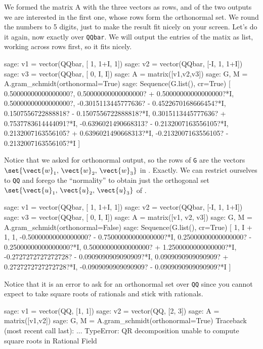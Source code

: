 %
We formed the matrix A with the three vectors as rows, and of the two outputs we are interested in the first one, whose rows form the orthonormal set.  We round the numbers to 5 digits, just to make the result fit nicely on your screen.  Let's do it again, now exactly over \verb?QQbar?.  We will output the entries of the matix as list, working across rows first, so it fits nicely.
%
\begin{sageexample}
sage: v1 = vector(QQbar, [ 1, 1+I,   1])
sage: v2 = vector(QQbar, [-I,   1, 1+I])
sage: v3 = vector(QQbar, [ 0,   I,   I])
sage: A = matrix([v1,v2,v3])
sage: G, M = A.gram_schmidt(orthonormal=True)
sage: Sequence(G.list(), cr=True)
[
0.50000000000000000?,
0.50000000000000000? + 0.50000000000000000?*I,
0.50000000000000000?,
-0.3015113445777636? - 0.4522670168666454?*I,
0.1507556722888818? - 0.1507556722888818?*I,
0.3015113445777636? + 0.7537783614444091?*I,
-0.6396021490668313? - 0.2132007163556105?*I,
0.2132007163556105? + 0.6396021490668313?*I,
-0.2132007163556105? - 0.2132007163556105?*I
]
\end{sageexample}
%
Notice that we asked for orthonormal output, so the rows of \verb?G? are the vectors $\set{\vect{w}_1,\,\vect{w}_2,\,\vect{w}_3}$ in .  Exactly.  We can restrict ourselves to \verb?QQ? and forego the ``normality'' to obtain just the orthogonal set $\set{\vect{u}_1,\,\vect{u}_2,\,\vect{u}_3}$ of .
%
\begin{sageexample}
sage: v1 = vector(QQbar, [ 1, 1+I,   1])
sage: v2 = vector(QQbar, [-I,   1, 1+I])
sage: v3 = vector(QQbar, [ 0,   I,   I])
sage: A = matrix([v1, v2, v3])
sage: G, M = A.gram_schmidt(orthonormal=False)
sage: Sequence(G.list(), cr=True)
[
1,
I + 1,
1,
-0.50000000000000000? - 0.75000000000000000?*I,
0.25000000000000000? - 0.25000000000000000?*I,
0.50000000000000000? + 1.2500000000000000?*I,
-0.2727272727272728? - 0.0909090909090909?*I,
0.0909090909090909? + 0.2727272727272728?*I,
-0.0909090909090909? - 0.0909090909090909?*I
]
\end{sageexample}
%
Notice that it is an error to ask for an orthonormal set over \verb?QQ? since you cannot expect to take square roots of rationals and stick with rationals.
%
\begin{sageexample}
sage: v1 = vector(QQ, [1, 1])
sage: v2 = vector(QQ, [2, 3])
sage: A = matrix([v1,v2])
sage: G, M = A.gram_schmidt(orthonormal=True)
Traceback (most recent call last):
...
TypeError: QR decomposition unable to compute square roots in Rational Field
\end{sageexample}
%
%
\begin{sageverbatim}
\end{sageverbatim}
%
